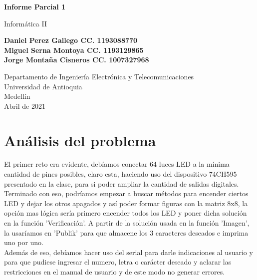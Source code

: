 \documentclass{article}
\begin{document}
\begin{titlepage}
    \begin{center}
        \vspace*{1cm}
            
        \Huge
        \textbf{Informe Parcial 1}
            
        \vspace{0.5cm}
        \LARGE
        Informática II
            
        \vspace{1.5cm}
            
        \textbf{Daniel Perez Gallego CC. 1193088770\\Miguel Serna Montoya CC. 1193129865\\Jorge Montaña Cisneros CC.  1007327968}
            
        \vfill
            
        \vspace{0.8cm}
            
        \Large
        Departamento de Ingeniería Electrónica y Telecomunicaciones\\
        Universidad de Antioquia\\
        Medellín\\
        Abril de 2021
            
    \end{center}
\end{titlepage}

\tableofcontents

\section{Análisis del problema}
El primer reto era evidente, debíamos conectar 64 luces LED a la mínima cantidad de pines posibles, claro esta, haciendo uso del dispositivo 74CH595 presentado en la clase, para si poder ampliar la cantidad de salidas digitales.\\

Terminado con eso, podríamos empezar a buscar métodos para encender ciertos LED y dejar los otros apagados y así poder formar figuras con la matriz 8x8, la opción mas lógica sería primero encender todos los LED y poner dicha solución en la función 'Verificación'. A partir de la solución usada en la función 'Imagen', la usaríamos en 'Publik' para que almacene los 3 caracteres deseados e imprima uno por uno.\\

Además de eso, debíamos hacer uso del serial para darle indicaciones al usuario y para que pudiese ingresar el numero, letra o carácter deseado y  aclarar las restricciones en el manual de usuario y de este modo no generar errores.
\end{document}

